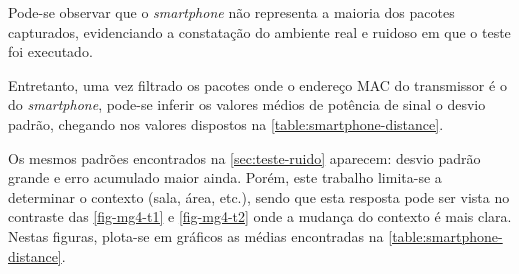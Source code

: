 Pode-se observar que o \emph{smartphone} não representa a maioria dos pacotes
capturados, evidenciando a constatação do ambiente real e ruidoso em que o teste
foi executado.

\FloatBarrier

Entretanto, uma vez filtrado os pacotes onde o endereço MAC do transmissor é o
do \emph{smartphone}, pode-se inferir os valores médios de potência de sinal o
desvio padrão, chegando nos valores dispostos na
\autoref{table:smartphone-distance}.

\begin{table}[htb]
\end{table}

Os mesmos padrões encontrados na \autoref{sec:teste-ruido} aparecem: desvio
padrão grande e erro acumulado maior ainda. Porém, este trabalho limita-se a
determinar o contexto (sala, área, etc.), sendo que esta resposta pode ser vista
no contraste das \autoref{fig-mg4-t1} e \autoref{fig-mg4-t2} onde a mudança do
contexto é mais clara. Nestas figuras, plota-se em gráficos as médias
encontradas na \autoref{table:smartphone-distance}.

